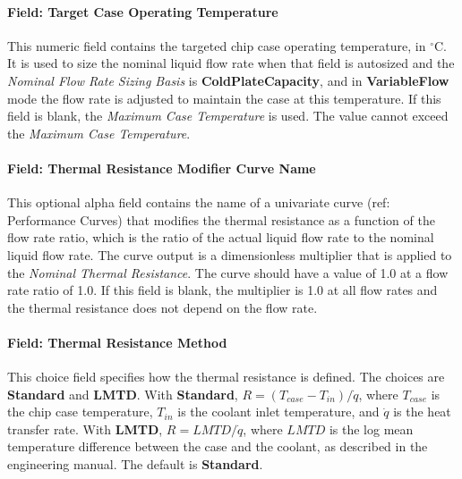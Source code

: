 \paragraph{Field: Target Case Operating Temperature}\label{field-target-case-operating-temperature-coilcoolingitecoldplate}

This numeric field contains the targeted chip case operating temperature, in $^\circ$C. It is used to size the nominal liquid flow rate when that field is autosized and the \emph{Nominal Flow Rate Sizing Basis} is \textbf{ColdPlateCapacity}, and in \textbf{VariableFlow} mode the flow rate is adjusted to maintain the case at this temperature. If this field is blank, the \emph{Maximum Case Temperature} is used. The value cannot exceed the \emph{Maximum Case Temperature}.

\paragraph{Field: Thermal Resistance Modifier Curve Name}\label{field-thermal-resistance-modifier-curve-name-coilcoolingitecoldplate}

This optional alpha field contains the name of a univariate curve (ref: Performance Curves) that modifies the thermal resistance as a function of the flow rate ratio, which is the ratio of the actual liquid flow rate to the nominal liquid flow rate. The curve output is a dimensionless multiplier that is applied to the \emph{Nominal Thermal Resistance}. The curve should have a value of 1.0 at a flow rate ratio of 1.0. If this field is blank, the multiplier is 1.0 at all flow rates and the thermal resistance does not depend on the flow rate.

\paragraph{Field: Thermal Resistance Method}\label{field-thermal-resistance-method-coilcoolingitecoldplate}

This choice field specifies how the thermal resistance is defined. The choices are \textbf{Standard} and \textbf{LMTD}. With \textbf{Standard}, \(R = (T_{case} - T_{in}) / \dot{q}\), where \(T_{case}\) is the chip case temperature, \(T_{in}\) is the coolant inlet temperature, and \(\dot{q}\) is the heat transfer rate. With \textbf{LMTD}, \(R = LMTD / \dot{q}\), where \(LMTD\) is the log mean temperature difference between the case and the coolant, as described in the engineering manual. The default is \textbf{Standard}.

